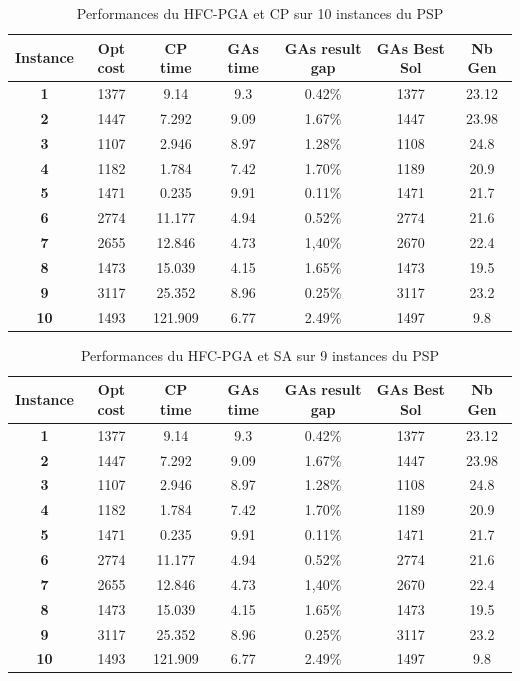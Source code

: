 \documentclass[12pt,a4paper]{article}
\begin{document}
	\begin{table}[h]
		\centering
		\begin{tabular}{|c|c|c|c|c|c|c|}
			\hline
			\textbf{Instance} & \textbf{Opt cost} & \textbf{CP time} & \textbf{GAs time} & \textbf{GAs result gap} & \textbf{GAs Best Sol} & \textbf{Nb Gen}\\
			\hline
			\textbf{1} & 1377 & 9.14 & 9.3 & 0.42\% & 1377 & 23.12 \\
			\textbf{2} & 1447 & 7.292 & 9.09 & 1.67\% & 1447 & 23.98\\
			\textbf{3} & 1107 & 2.946 & 8.97 & 1.28\% & 1108 & 24.8\\
			\textbf{4} & 1182 & 1.784 & 7.42 & 1.70\% & 1189 & 20.9\\
			\textbf{5} & 1471 & 0.235 & 9.91 & 0.11\% & 1471 & 21.7\\
			\textbf{6} & 2774 & 11.177 & 4.94 & 0.52\% & 2774 & 21.6\\
			\textbf{7} & 2655 & 12.846 & 4.73 & 1,40\% & 2670 & 22.4\\
			\textbf{8} & 1473 & 15.039 & 4.15 & 1.65\% & 1473 & 19.5\\
			\textbf{9} & 3117 & 25.352 & 8.96 & 0.25\% & 3117 & 23.2\\
			\textbf{10} & 1493 & 121.909 & 6.77 & 2.49\% & 1497 & 9.8\\
			\hline
		\end{tabular}	
		\caption{Performances du HFC-PGA et CP sur 10 instances du PSP}	
	\end{table}			
	
	\begin{table}[h]
		\centering
		\begin{tabular}{|c|c|c|c|c|c|c|}
			\hline
			\textbf{Instance} & \textbf{Opt cost} & \textbf{CP time} & \textbf{GAs time} & \textbf{GAs result gap} & \textbf{GAs Best Sol} & \textbf{Nb Gen}\\
			\hline
			\textbf{1} & 1377 & 9.14 & 9.3 & 0.42\% & 1377 & 23.12 \\
			\textbf{2} & 1447 & 7.292 & 9.09 & 1.67\% & 1447 & 23.98\\
			\textbf{3} & 1107 & 2.946 & 8.97 & 1.28\% & 1108 & 24.8\\
			\textbf{4} & 1182 & 1.784 & 7.42 & 1.70\% & 1189 & 20.9\\
			\textbf{5} & 1471 & 0.235 & 9.91 & 0.11\% & 1471 & 21.7\\
			\textbf{6} & 2774 & 11.177 & 4.94 & 0.52\% & 2774 & 21.6\\
			\textbf{7} & 2655 & 12.846 & 4.73 & 1,40\% & 2670 & 22.4\\
			\textbf{8} & 1473 & 15.039 & 4.15 & 1.65\% & 1473 & 19.5\\
			\textbf{9} & 3117 & 25.352 & 8.96 & 0.25\% & 3117 & 23.2\\
			\textbf{10} & 1493 & 121.909 & 6.77 & 2.49\% & 1497 & 9.8\\
			\hline
		\end{tabular}	
		\caption{Performances du HFC-PGA et SA sur 9 instances du PSP}	
	\end{table}			
		
\end{document}
